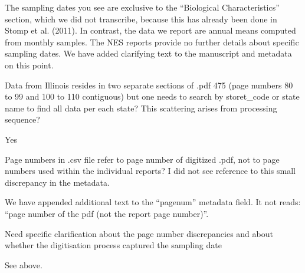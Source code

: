 \documentclass{article}
\begin{document}
The sampling dates you see are exclusive to the “Biological Characteristics” section, which we did not transcribe, because this has already been done in Stomp et al. (2011). In contrast, the data we report are annual means computed from monthly samples. The NES reports provide no further details about specific sampling dates. We have added clarifying text to the manuscript and metadata on this point.

Data from Illinois resides in two separate sections of .pdf 475 (page numbers 80 to 99 and 100 to 110 contiguous) but one needs to search by storet\_code or state name to find all data per each state? This scattering arises from processing sequence?

Yes

Page numbers in .csv file refer to page number of digitized .pdf, not to page numbers used within the individual reports? I did not see reference to this small discrepancy in the metadata.

We have appended additional text to the “pagenum” metadata field. It not reads: “page number of the pdf (not the report page number)”. 

Need specific clarification about the page number discrepancies and about whether the digitisation process captured the sampling date

See above.
\end{document}
